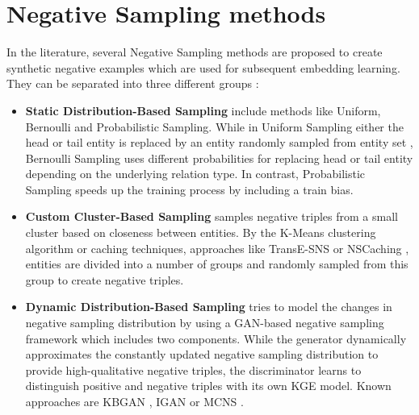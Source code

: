 \section{Negative Sampling methods} 
In the literature, several Negative Sampling methods are proposed to create synthetic negative examples which are used for subsequent embedding learning.
They can be separated into three different groups \cite{qianunderstanding}:
\begin{itemize}
    \item 
    \textbf{Static Distribution-Based Sampling} include methods like Uniform, Bernoulli and Probabilistic Sampling.
	While in Uniform Sampling either the head or tail entity is replaced by an entity randomly sampled from entity set \entities,
	Bernoulli Sampling uses different probabilities for replacing head or tail entity depending on the underlying relation type.
	In contrast, Probabilistic Sampling speeds up the training process by including a train bias.
	
	\item 
    \textbf{Custom Cluster-Based Sampling} samples negative triples from a small cluster based on closeness between entities.
	By the K-Means clustering algorithm or caching techniques, approaches like TransE-\ac{SNS} \cite{TransE-SNS} or \ac{NSCaching} \cite{NSCaching}, entities are divided into a number of groups and randomly sampled from
	this group to create negative triples.	
    
    \item 
    \textbf{Dynamic Distribution-Based Sampling} tries to model the changes in negative sampling distribution by using a \ac{GAN}-based negative sampling
	framework which includes two components.
	While the generator dynamically approximates the constantly updated negative sampling distribution to provide high-qualitative negative triples, 
	the discriminator learns to distinguish positive and negative triples with its own \ac{KGE} model.
	Known approaches are \ac{KBGAN} \cite{cai2017kbgan}, \ac{IGAN}  \cite{IGAN} or \ac{MCNS} \cite{MCNS}.
\end{itemize}

